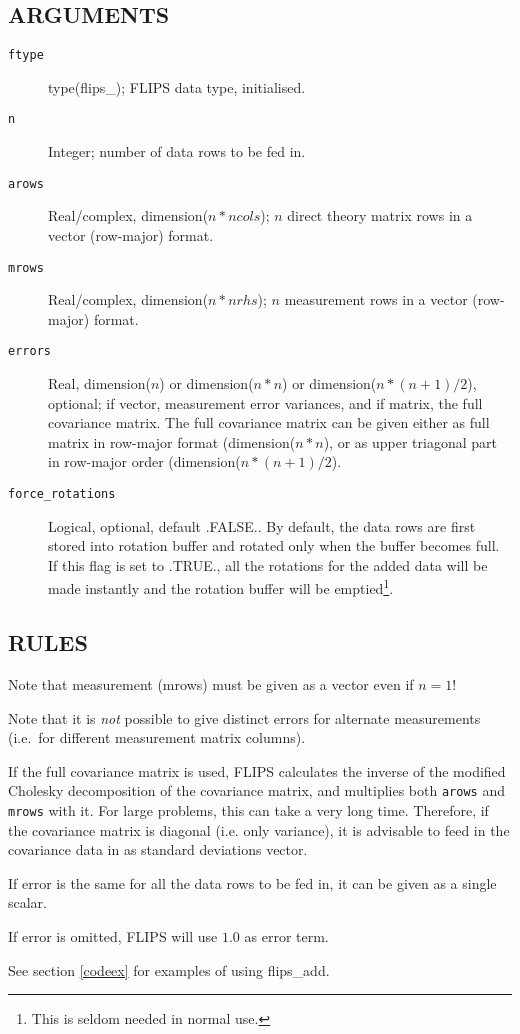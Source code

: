 \documentclass[a4paper,twoside]{refrep}
\newcommand{\aitem}[1]{\item[{\tt #1}]}
\newenvironment{arglist}
	{\begin{description}}
	{\end{description}}
\begin{document}
\subsection*{ARGUMENTS}
\begin{arglist}
\aitem{ftype} type(flips\_<s|d|c|z>); FLIPS data type, initialised.
\aitem{n} Integer; number of data rows to be fed in.
\aitem{arows} Real/complex, dimension($n*ncols$); $n$ direct theory matrix rows in a vector (row-major) format. 
\aitem{mrows} Real/complex, dimension($n*nrhs$); $n$ measurement rows in a vector (row-major) format.
\aitem{errors} Real, dimension($n$) or dimension($n*n$) or dimension($n*(n+1)/2$), optional; if vector, measurement error variances, and if matrix, the full covariance matrix. The full covariance matrix can be given either as full matrix in row-major format (dimension($n*n$), or as upper triagonal part in row-major order (dimension($n*(n+1)/2$).
\aitem{force\_rotations} Logical, optional, default .FALSE.. By default, the data rows are first stored into rotation buffer and rotated only when the buffer becomes full. If this flag is set to .TRUE., all the rotations for the added data will be made instantly and the rotation buffer will be emptied\footnote{This is seldom needed in normal use.}. 
\end{arglist}

\subsection*{RULES}
\attention Note that measurement (mrows) must be given as a vector even if $n=1$!

\attention Note that it is \emph{not} possible to give distinct errors for alternate measurements (i.e.\ for different measurement matrix columns). 

If the full covariance matrix is used, FLIPS calculates the inverse of the modified Cholesky decomposition of the covariance matrix, and multiplies both \verb!arows! and \verb!mrows! with it. For large problems, this can take a very long time. Therefore, if the covariance matrix is diagonal (i.e. only variance), it is advisable to feed in the covariance data in as standard deviations vector.

If error is the same for all the data rows to be fed in, it can be given as a single scalar.

If error is omitted, FLIPS will use $1.0$ as error term.

 See section \ref{codeex} for examples of using flips\_add.
\end{document}
